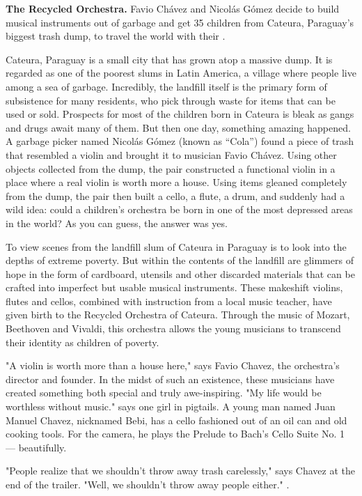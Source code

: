 %
%
\textbf{The Recycled Orchestra.} Favio Chávez and Nicolás Gómez decide to build musical instruments out of garbage and get 35 children from Cateura, Paraguay’s biggest trash dump, to travel the world with their . 

Cateura, Paraguay is a small city that has grown atop a massive dump. It is regarded as one of the poorest slums in Latin America, a village where people live among a sea of garbage. Incredibly, the landfill itself is the primary form of subsistence for many residents, who pick through waste for items that can be used or sold. Prospects for most of the children born in Cateura is bleak as gangs and drugs await many of them. But then one day, something amazing happened. A garbage picker named Nicolás Gómez (known as “Cola”) found a piece of trash that resembled a violin and brought it to musician Favio Chávez. Using other objects collected from the dump, the pair constructed a functional violin in a place where a real violin is worth more a house. Using items gleaned completely from the dump, the pair then built a cello, a flute, a drum, and suddenly had a wild idea: could a children’s orchestra be born in one of the most depressed areas in the world? As you can guess, the answer was yes.

To view scenes from the landfill slum of Cateura in Paraguay is to look into the depths of extreme poverty. But within the contents of the landfill are glimmers of hope in the form of cardboard, utensils and other discarded materials that can be crafted into imperfect but usable musical instruments. These makeshift violins, flutes and cellos, combined with instruction from a local music teacher, have given birth to the Recycled Orchestra of Cateura. Through the music of Mozart, Beethoven and Vivaldi, this orchestra allows the young musicians to transcend their identity as children of poverty.

"A violin is worth more than a house here," says Favio Chavez, the orchestra's director and founder. In the midst of such an existence, these musicians have created something both special and truly awe-inspiring. "My life would be worthless without music." says one girl in pigtails. A young man named Juan Manuel Chavez, nicknamed Bebi, has a cello fashioned out of an oil can and old cooking tools. For the camera, he plays the Prelude to Bach's Cello Suite No. 1 — beautifully.

"People realize that we shouldn't throw away trash carelessly," says Chavez at the end of the trailer. "Well, we shouldn't throw away people either." .

